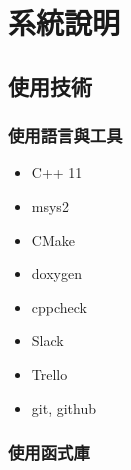 \chapter{系統說明}

\section{使用技術}

\subsection{使用語言與工具}

\begin{itemize}
	\item{C++ 11}
	\item{msys2}
	\item{CMake}
	\item{doxygen}
	\item{cppcheck}
	\item{Slack}
	\item{Trello}
	\item{git, github}
\end{itemize}

\subsection{使用函式庫}

